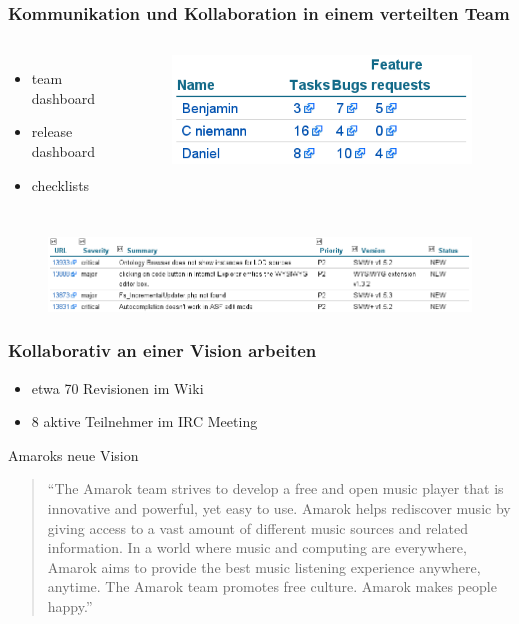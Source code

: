 \documentclass{beamer}
\begin{document}
\begin{frame}
\frametitle{Kommunikation und Kollaboration in einem verteilten Team}
\begin{columns}
   \begin{itemize}
     \item team dashboard
     \item release dashboard
     \item checklists
   \end{itemize}
   \begin{figure}
     \includegraphics[scale=0.4,keepaspectratio=true]{./TeamDashboardTable.png}
   \end{figure}
\end{columns}
   \begin{figure}
     \includegraphics[scale=0.45,keepaspectratio=true]{./bugListHalo.png}
   \end{figure}
\end{frame}

\begin{frame}
\frametitle{Kollaborativ an einer Vision arbeiten}
\begin{itemize}
 \item etwa 70 Revisionen im Wiki
 \item 8 aktive Teilnehmer im IRC Meeting
\end{itemize}
\begin{block}{Amaroks neue Vision}
\begin{quotation}``The Amarok team strives to develop a free and open music player that is innovative and powerful, yet easy to use. Amarok helps rediscover music by giving access to a vast amount of different music sources and related information. In a world where music and computing are everywhere, Amarok aims to provide the best music listening experience anywhere, anytime. The Amarok team promotes free culture. Amarok makes people happy.''\end{quotation}
\end{block}
\end{frame}
\end{document}
